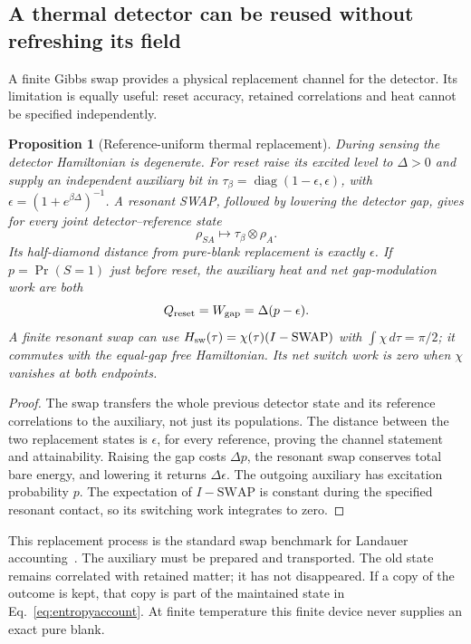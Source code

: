 \documentclass[12pt,a4paper]{article}
\newtheorem{proposition}[theorem]{Proposition}
\begin{document}
\subsection{A thermal detector can be reused without refreshing its field}
\label{sec:thermal-sensor-renewal}

A finite Gibbs swap provides a physical replacement channel for the detector.
Its limitation is equally useful: reset accuracy, retained correlations and
heat cannot be specified independently.

\begin{proposition}[Reference-uniform thermal replacement]
\label{prop:thermal-detector-reset}
During sensing the detector Hamiltonian is degenerate. For reset raise its
excited level to $\Delta>0$ and supply an independent auxiliary bit in
$\tau_\beta=\operatorname{diag}(1-\epsilon,\epsilon)$, with
$\epsilon=(1+e^{\beta\Delta})^{-1}$. A resonant SWAP, followed by lowering
the detector gap, gives for every joint detector--reference state
\[
 \rho_{SA}\longmapsto\tau_\beta\otimes\rho_A .
\]
Its half-diamond distance from pure-blank replacement is exactly $\epsilon$.
If $p=\Pr(S=1)$ just before reset, the auxiliary heat and net gap-modulation
work are both
\begin{equation}\label{eq:thermal-sensor-reset-charge}
 Q_{\rm reset}=W_{\rm gap}=\Delta(p-\epsilon).
\end{equation}
A finite resonant swap can use
$H_{\rm sw}(\tau)=\chi(\tau)(I-\mathrm{SWAP})$ with
$\int\chi\,d\tau=\pi/2$; it commutes with the equal-gap free Hamiltonian.
Its net switch work is zero when $\chi$ vanishes at both endpoints.
\end{proposition}
\begin{proof}
The swap transfers the whole previous detector state and its reference
correlations to the auxiliary, not just its populations.
The distance between the two replacement states is $\epsilon$, for every
reference, proving the channel statement and attainability.
Raising the gap costs $\Delta p$, the resonant swap conserves total bare energy,
and lowering it returns $\Delta\epsilon$.
The outgoing auxiliary has excitation probability $p$.
The expectation of $I-\mathrm{SWAP}$ is constant during the specified
resonant contact, so its switching work integrates to zero.
\end{proof}
This replacement process is the standard swap benchmark for Landauer
accounting~\cite[Example~1 and Sec.~3.3]{ReebWolf2014}.
The auxiliary must be prepared and transported. The old state remains
correlated with retained matter; it has not disappeared.
If a copy of the outcome is kept, that copy is part of the maintained state
in Eq.~\eqref{eq:entropyaccount}.
At finite temperature this finite device never supplies an exact pure blank.
\end{document}
